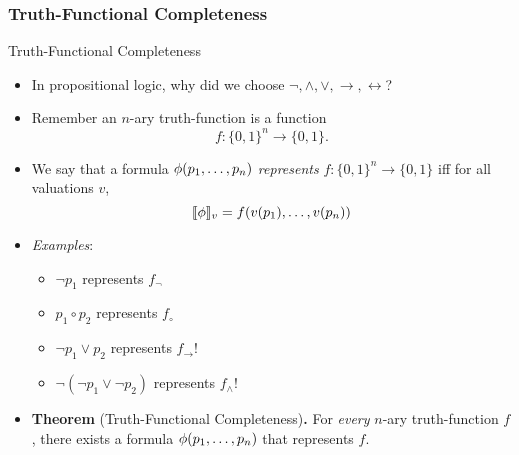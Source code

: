 \documentclass[../slides.tex]{subfiles}
\begin{document}
\subsubsection{Truth-Functional Completeness}
\begin{frame}{Truth-Functional Completeness}

  \begin{itemize}

  \item In propositional logic, why did we choose
    $\neg,\land,\lor,\to,\leftrightarrow$?

  \item Remember an $n$-ary truth-function is a function
    \[f:\{0,1\}^n\to \{0,1\}.\] 
    
  \item We say that a formula $\phi(p_1, \mathellipsis, p_n)$
    \emph{represents} $f:\{0,1\}^n\to \{0,1\}$ iff for all valuations
    $v$, \[\llbracket \phi\rrbracket_v=f(v(p_1),\mathellipsis,
      v(p_n))\]

  \item \emph{Examples}:
    \begin{itemize}
    \item $\neg p_1$ represents $f_\neg$
    \item $p_1\circ p_2$ represents $f_\circ$
    \item $\neg p_1\lor p_2$ represents $f_\to$!
    \item $\neg (\neg p_1\lor \neg p_2)$ represents $f_\land$!
    \end{itemize}

    \item \textbf{Theorem} (Truth-Functional Completeness)\textbf{.}
      For \emph{every} $n$-ary truth-function $f$, there exists a
      formula $\phi(p_1, \mathellipsis, p_n)$ that represents $f$. 

  \end{itemize}

\end{frame}
\end{document}
